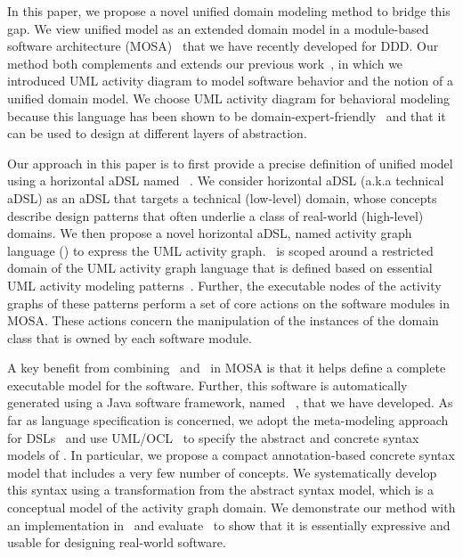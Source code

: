 In this paper, we propose a novel unified domain modeling method to bridge this gap. 
We view unified model as an extended domain model in a module-based software architecture (MOSA)~\cite{le_generative_2018} that we have recently developed for DDD.
Our method both complements and extends our previous work~\cite{le_domain_2018}, in which we introduced UML activity diagram to model software behavior and the notion of a unified domain model.
We choose UML activity diagram for behavioral modeling because this language has been shown to be domain-expert-friendly~\cite{dumas_uml_2001} and that it can be used to design at different layers of abstraction. 

Our approach in this paper is to first provide a precise definition of unified model using a horizontal aDSL named \dcsl~\cite{le_domain_2018}. We consider horizontal aDSL (a.k.a technical aDSL) as an aDSL that targets a technical (low-level) domain, whose concepts describe design patterns that often underlie a class of real-world (high-level) domains. 
%
We then propose a novel horizontal aDSL, named activity graph language (\agl) to express the UML activity graph. \agl~is scoped around a restricted domain of the UML activity graph language that is defined based on essential UML activity modeling patterns~\cite{omg_unified_2015}. 
Further, the executable nodes of the activity graphs of these patterns perform a set of core actions on the software modules in MOSA. These actions concern the manipulation of the instances of the domain class that is owned by each software module.

A key benefit from combining \dcsl~and \agl~in MOSA is that it helps define a complete executable model for the software. Further, this software is automatically generated using a Java software framework, named \jdomainapp~\cite{le_jdomainapp_2017}, that we have developed.
%
As far as language specification is concerned, we adopt the meta-modeling approach for DSLs~\cite{kleppe_software_2008} and use UML/OCL~\cite{omg_unified_2015, omg_object_2014} to specify the abstract and concrete syntax models of \agl. In particular, we propose a compact annotation-based concrete syntax model that includes a very few number of concepts. We systematically develop this syntax using a transformation from the abstract syntax model, which is a conceptual model of the activity graph domain.
%
We demonstrate our method with an implementation in \jdomainapp~and evaluate \agl~to show that it is essentially expressive and usable for designing real-world software. 

